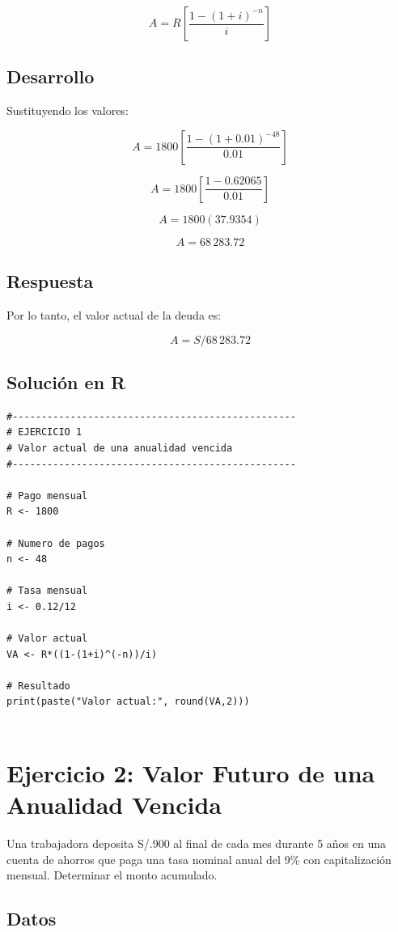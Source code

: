 \documentclass[12pt]{article}
\begin{document}
\[
A=R\left[\frac{1-(1+i)^{-n}}{i}\right]
\]

\subsection*{Desarrollo}

Sustituyendo los valores:

\[
A=1800
\left[
\frac{1-(1+0.01)^{-48}}
{0.01}
\right]
\]

\[
A=1800
\left[
\frac{1-0.62065}
{0.01}
\right]
\]

\[
A=1800(37.9354)
\]

\[
A=68\,283.72
\]

\subsection*{Respuesta}

Por lo tanto, el valor actual de la deuda es:

\[
\boxed{A=S/68\,283.72}
\]

\subsection*{Solución en R}

\begin{lstlisting}
#-------------------------------------------------
# EJERCICIO 1
# Valor actual de una anualidad vencida
#-------------------------------------------------

# Pago mensual
R <- 1800

# Numero de pagos
n <- 48

# Tasa mensual
i <- 0.12/12

# Valor actual
VA <- R*((1-(1+i)^(-n))/i)

# Resultado
print(paste("Valor actual:", round(VA,2)))


\end{lstlisting}

\section*{Ejercicio 2: Valor Futuro de una Anualidad Vencida}

Una trabajadora deposita S/.900 al final de cada mes durante 5 años en una cuenta de ahorros que paga una tasa nominal anual del 9\% con capitalización mensual. Determinar el monto acumulado.

\subsection*{Datos}
\end{document}
